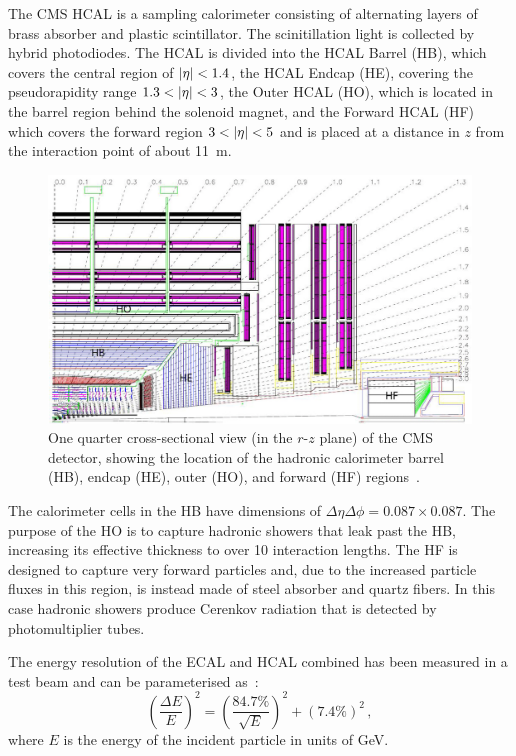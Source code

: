 
The CMS HCAL is a sampling calorimeter consisting of alternating layers of 
brass absorber and plastic scintillator. The scinitillation light is collected 
by hybrid photodiodes. The HCAL is divided into the HCAL Barrel (HB), which 
covers the central region of $|\eta| < 1.4$, the HCAL Endcap (HE), covering 
the pseudorapidity range $1.3 < |\eta| < 3$, the Outer HCAL (HO), which is 
located in the barrel region behind the solenoid magnet, and the 
Forward HCAL (HF) which covers the forward region $3 < |\eta| < 5$ and is 
placed at a distance in $z$ from the interaction point of about 11~m. 

\begin{figure}
	\begin{center}
		\includegraphics[width=0.7\linewidth]{figs/detector/hcal}
	\end{center}
	\caption{One quarter cross-sectional view (in the $r$-$z$ plane) of the CMS 
		detector, showing the location of the hadronic calorimeter barrel (HB), 
		endcap 
		(HE), outer (HO), and forward (HF) regions~\cite{cms}.}
	\label{fig:hcal}
\end{figure}

The calorimeter cells in the HB have dimensions of $\Delta\eta\Delta\phi = 
0.087 \times 0.087$. %
The purpose of the HO is to capture hadronic showers that leak past the HB, 
increasing its effective thickness to over 10 interaction lengths. 
The HF is designed to capture very forward particles and, due to the increased 
particle fluxes in this region, is instead made of steel absorber and quartz 
fibers. In this case hadronic showers produce Cerenkov radiation that is 
detected by photomultiplier tubes. 

The energy resolution of the ECAL and HCAL combined has been measured in a test 
beam and can be parameterised as~\cite{calo-resolution}:
\begin{equation}
\left(\frac{\Delta E}{E}\right)^2 = \left(\frac{84.7\%}{\sqrt{E}}\right)^2 + 
(7.4\%)^2 \, ,
\end{equation}
where $E$ is the energy of the incident particle in units of GeV.

